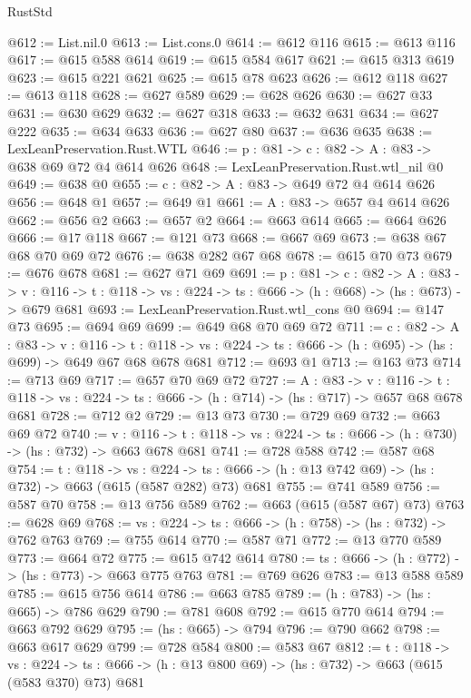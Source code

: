 \begin{lexlean}{RustStd}
\begin{coremodule}
{\begin{coremodule}
{{{{{{{@612 := List.nil.{0}
@613 := List.cons.{0}
@614 := @612 @116
@615 := @613 @116
@617 := @615 @588 @614
@619 := @615 @584 @617
@621 := @615 @313 @619
@623 := @615 @221 @621
@625 := @615 @78 @623
@626 := @612 @118
@627 := @613 @118
@628 := @627 @589
@629 := @628 @626
@630 := @627 @33
@631 := @630 @629
@632 := @627 @318
@633 := @632 @631
@634 := @627 @222
@635 := @634 @633
@636 := @627 @80
@637 := @636 @635
@638 := LexLeanPreservation.Rust.WTL
@646 := {p : @81} -> {c : @82} -> {A : @83} -> @638 @69 @72 @4 @614 @626
@648 := LexLeanPreservation.Rust.wtl_nil @0
@649 := @638 @0
@655 := {c : @82} -> {A : @83} -> @649 @72 @4 @614 @626
@656 := @648 @1
@657 := @649 @1
@661 := {A : @83} -> @657 @4 @614 @626
@662 := @656 @2
@663 := @657 @2
@664 := @663 @614
@665 := @664 @626
@666 := @17 @118
@667 := @121 @73
@668 := @667 @69
@673 := @638 @67 @68 @70 @69 @72
@676 := @638 @282 @67 @68
@678 := @615 @70 @73
@679 := @676 @678
@681 := @627 @71 @69
@691 := {p : @81} ->
  {c : @82} ->
  {A : @83} ->
  {v : @116} -> {t : @118} -> {vs : @224} -> {ts : @666} -> (h : @668) -> (hs : @673) -> @679 @681
@693 := LexLeanPreservation.Rust.wtl_cons @0
@694 := @147 @73
@695 := @694 @69
@699 := @649 @68 @70 @69 @72
@711 := {c : @82} ->
  {A : @83} ->
  {v : @116} ->
  {t : @118} -> {vs : @224} -> {ts : @666} -> (h : @695) -> (hs : @699) -> @649 @67 @68 @678 @681
@712 := @693 @1
@713 := @163 @73
@714 := @713 @69
@717 := @657 @70 @69 @72
@727 := {A : @83} ->
  {v : @116} ->
  {t : @118} -> {vs : @224} -> {ts : @666} -> (h : @714) -> (hs : @717) -> @657 @68 @678 @681
@728 := @712 @2
@729 := @13 @73
@730 := @729 @69
@732 := @663 @69 @72
@740 := {v : @116} ->
  {t : @118} -> {vs : @224} -> {ts : @666} -> (h : @730) -> (hs : @732) -> @663 @678 @681
@741 := @728 @588
@742 := @587 @68
@754 := {t : @118} ->
  {vs : @224} ->
  {ts : @666} -> (h : @13 @742 @69) -> (hs : @732) -> @663 (@615 (@587 @282) @73) @681
@755 := @741 @589
@756 := @587 @70
@758 := @13 @756 @589
@762 := @663 (@615 (@587 @67) @73)
@763 := @628 @69
@768 := {vs : @224} -> {ts : @666} -> (h : @758) -> (hs : @732) -> @762 @763
@769 := @755 @614
@770 := @587 @71
@772 := @13 @770 @589
@773 := @664 @72
@775 := @615 @742 @614
@780 := {ts : @666} -> (h : @772) -> (hs : @773) -> @663 @775 @763
@781 := @769 @626
@783 := @13 @588 @589
@785 := @615 @756 @614
@786 := @663 @785
@789 := (h : @783) -> (hs : @665) -> @786 @629
@790 := @781 @608
@792 := @615 @770 @614
@794 := @663 @792 @629
@795 := (hs : @665) -> @794
@796 := @790 @662
@798 := @663 @617 @629
@799 := @728 @584
@800 := @583 @67
@812 := {t : @118} ->
  {vs : @224} ->
  {ts : @666} -> (h : @13 @800 @69) -> (hs : @732) -> @663 (@615 (@583 @370) @73) @681
}}}}}}}
\end{coremodule}}
\end{coremodule}
\end{lexlean}
